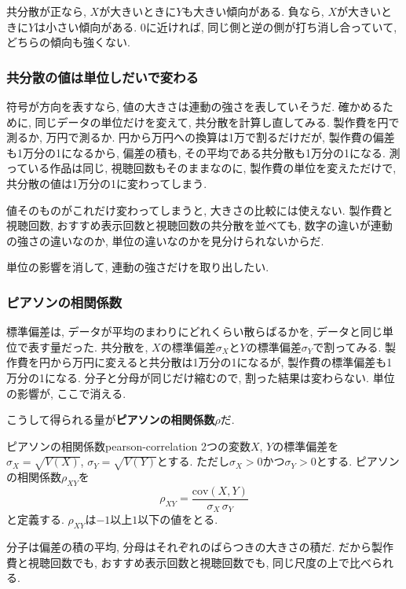 共分散が正なら, $X$が大きいときに$Y$も大きい傾向がある.
負なら, $X$が大きいときに$Y$は小さい傾向がある.
0に近ければ, 同じ側と逆の側が打ち消し合っていて, どちらの傾向も強くない.

\subsubsection*{共分散の値は単位しだいで変わる}

符号が方向を表すなら, 値の大きさは連動の強さを表していそうだ.
確かめるために, 同じデータの単位だけを変えて, 共分散を計算し直してみる.
製作費を円で測るか, 万円で測るか.
円から万円への換算は1万で割るだけだが, 製作費の偏差も1万分の1になるから, 偏差の積も, その平均である共分散も1万分の1になる.
測っている作品は同じ, 視聴回数もそのままなのに, 製作費の単位を変えただけで, 共分散の値は1万分の1に変わってしまう.

値そのものがこれだけ変わってしまうと, 大きさの比較には使えない.
製作費と視聴回数, おすすめ表示回数と視聴回数の共分散を並べても, 数字の違いが連動の強さの違いなのか, 単位の違いなのかを見分けられないからだ.

単位の影響を消して, 連動の強さだけを取り出したい.

\subsubsection*{ピアソンの相関係数}

標準偏差は, データが平均のまわりにどれくらい散らばるかを, データと同じ単位で表す量だった.
共分散を, $X$の標準偏差$\sigma_X$と$Y$の標準偏差$\sigma_Y$で割ってみる.
製作費を円から万円に変えると共分散は1万分の1になるが, 製作費の標準偏差も1万分の1になる.
分子と分母が同じだけ縮むので, 割った結果は変わらない.
単位の影響が, ここで消える.

こうして得られる量が\textbf{ピアソンの相関係数}$\rho$だ.

\begin{defi}[]{ピアソンの相関係数}{pearson-correlation}
2つの変数$X$, $Y$の標準偏差を$\sigma_X = \sqrt{V(X)}$, $\sigma_Y = \sqrt{V(Y)}$とする. ただし$\sigma_X > 0$かつ$\sigma_Y > 0$とする. ピアソンの相関係数$\rho_{XY}$を
\[
\rho_{XY} = \frac{\mathrm{cov}(X,Y)}{\sigma_X \, \sigma_Y}
\]
と定義する. $\rho_{XY}$は$-1$以上$1$以下の値をとる.
\end{defi}

分子は偏差の積の平均, 分母はそれぞれのばらつきの大きさの積だ.
だから製作費と視聴回数でも, おすすめ表示回数と視聴回数でも, 同じ尺度の上で比べられる.

